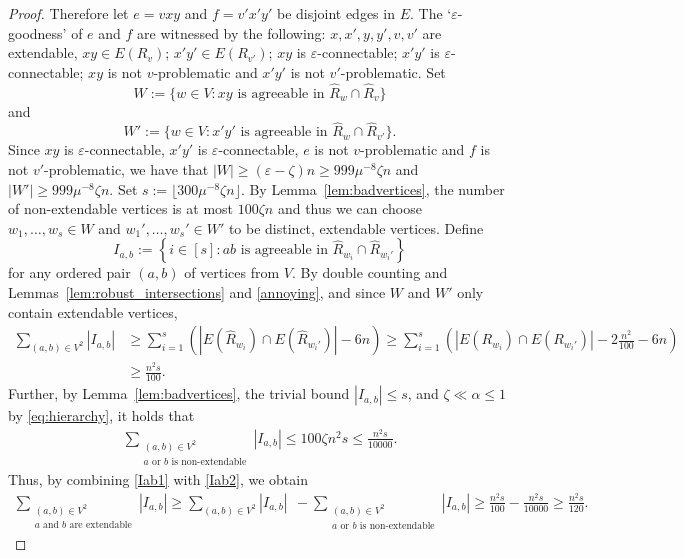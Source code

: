 \documentclass[A4paper,12pt]{article}
\theoremstyle{definition}
\newcommand{\eps}{\varepsilon}
\begin{document}
\begin{proof}[Proof]
Therefore let $e=vxy$ and $f=v'x'y'$ be disjoint edges in $E$. The `$\varepsilon$-goodness' of $e$ and $f$ are witnessed by the following: $x,x',y,y',v,v'$ are extendable, $xy \in E(R_v)$; $x'y' \in E(R_{v'})$; $xy$ is $\eps$-connectable; $x'y'$ is $\eps$-connectable; $xy$ is not $v$-problematic and $x'y'$ is not $v'$-problematic. Set
$$
W:=\{w\in V: xy \text{ is agreeable in } \hat{R}_w\cap \hat{R}_v\}
$$
and
$$
W':=\{w\in V: x'y' \text{ is agreeable in } \hat{R}_w\cap \hat{R}_{v'}\}.
$$
Since $xy$ is $\eps$-connectable, $x'y'$ is $\eps$-connectable, $e$ is not $v$-problematic and $f$ is not $v'$-problematic, we have that  $|W|\geq (\eps - \zeta)n \ge 999\mu^{-8}\zeta n$ and $|W'|\geq 999\mu^{-8}\zeta n$. Set ${s:=\lfloor 300\mu^{-8}\zeta n \rfloor}$.
By Lemma~\ref{lem:badvertices}, the number of non-extendable vertices is at most $100\zeta n$  and thus we can choose
$w_1, \ldots , w_s \in W$ and $w_1', \ldots , w_s' \in W'$ to be distinct, extendable vertices. Define
\[
I_{a,b} := \left\{ i \in [s] : ab \text{ is agreeable in } \hat{R}_{w_i} \cap \hat{R}_{w_i'} \right\}
\]
for any ordered pair $(a,b)$ of vertices from $V$. By double counting and Lemmas~\ref{lem:robust_intersections} and \ref{annoying}, and since $W$ and $W'$ only contain extendable vertices,
\begin{align}
\label{Iab1}
\nonumber
\sum_{(a,b)\in V^2} |I_{a,b}|
 &\geq \sum_{i=1}^s \left(\left| E(\hat{R}_{w_i}) \cap E(\hat{R}_{w_i'}) \right|-6n \right)
 \geq \sum_{i=1}^s \left(\left| E(R_{w_i}) \cap E(R_{w_i'}) \right|-2\frac{n^2}{100}-6n \right)\\
&\ge  \frac{n^2 s}{100}.
\end{align}
Further, by Lemma~\ref{lem:badvertices}, the trivial bound $|I_{a,b}|\leq s$, and $\zeta \ll \alpha \leq 1$ by \eqref{eq:hierarchy}, it holds that
\begin{align}
\label{Iab2}
\sum_{\substack{(a,b)\in V^2 \\ a \text{ or } b \text{ is non-extendable}}} |I_{a,b}|\leq 100 \zeta n^2 s \leq \frac{n^2s}{10000}.
\end{align}
Thus, by combining \eqref{Iab1} with \eqref{Iab2}, we obtain
\begin{align*}
\sum_{\substack{(a,b)\in V^2 \\ a \text{ and } b \text{ are extendable}}} |I_{a,b}|\geq \sum_{(a,b)\in V^2} |I_{a,b}| \ \ - \sum_{\substack{(a,b)\in V^2 \\ a \text{ or } b \text{ is non-extendable}}} |I_{a,b}| \geq \frac{n^2 s}{100} - \frac{n^2 s}{10000} \geq \frac{n^2 s}{120}.
\end{align*}


\end{proof}
\end{document}
